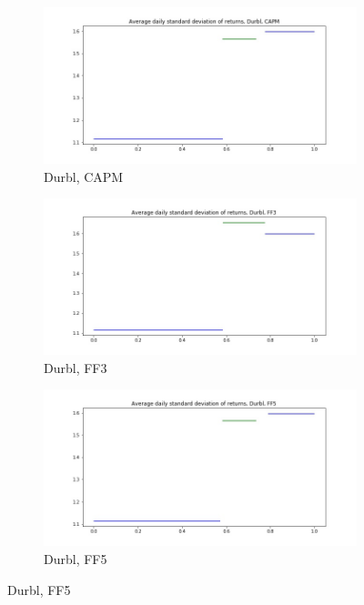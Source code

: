 \documentclass{article}
\begin{document}
\begin{figure}
\centering
  \begin{subfigure}[b]{0.3\textwidth}
    \includegraphics[width=\textwidth]{Durbl/daily_stdevCAPM.jpg}
    \caption{Durbl, CAPM}
    \label{fig:1}
  \end{subfigure}
  \begin{subfigure}[b]{0.3\textwidth}
    \includegraphics[width=\textwidth]{Durbl/daily_stdevFF3.jpg}
    \caption{Durbl, FF3}
    \label{fig:2}
  \end{subfigure}
   \begin{subfigure}[b]{0.3\textwidth}
    \includegraphics[width=\textwidth]{Durbl/daily_stdevFF5.jpg}
    \caption{Durbl, FF5}
    \label{fig:2}
  \end{subfigure}
  \end{figure}
 
\end{document}
